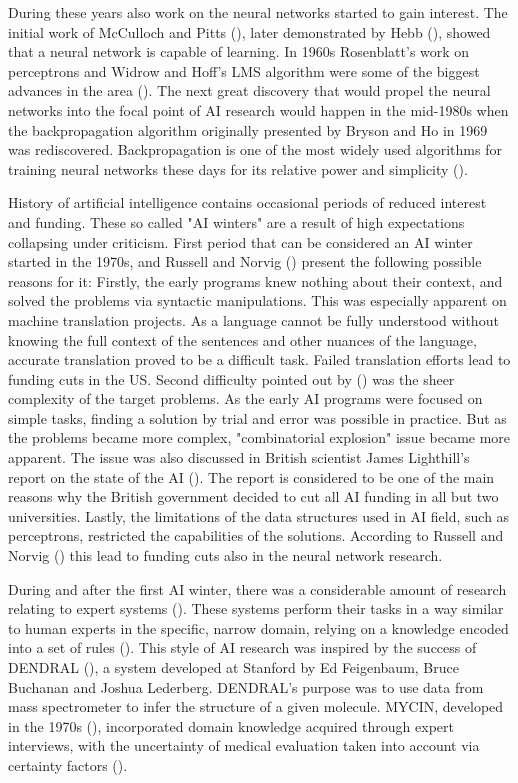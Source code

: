 \documentclass[utf8,english]{gradu3}
\begin{document}
During these years also work on the neural networks started to gain interest. The initial work of McCulloch and Pitts (\cite*{mcculloch1943}), later demonstrated by Hebb (\cite{norvig2002}), showed that a neural network is capable of learning. In 1960s Rosenblatt's work on perceptrons and Widrow and Hoff's LMS algorithm were some of the biggest advances in the area (\cite{widrow1995}). The next great discovery that would propel the neural networks into the focal point of AI research would happen in the mid-1980s when the backpropagation algorithm originally presented by Bryson and Ho in 1969 was rediscovered. Backpropagation is one of the most widely used algorithms for training neural networks these days for its relative power and simplicity (\cite{rumelhart1995}).

History of artificial intelligence contains occasional periods of reduced interest and funding. These so called "AI winters" are a result of high expectations collapsing under criticism. First period that can be considered an AI winter started in the 1970s, and Russell and Norvig (\cite*{norvig2002}) present the following possible reasons for it: Firstly, the early programs knew nothing about their context, and solved the problems via syntactic manipulations. This was especially apparent on machine translation projects. As a language cannot be fully understood without knowing the full context of the sentences and other nuances of the language, accurate translation proved to be a difficult task. Failed translation efforts lead to funding cuts in the US.
Second difficulty pointed out by (\cite{norvig2002}) was the sheer complexity of the target problems. As the early AI programs were focused on simple tasks, finding a solution by trial and error was possible in practice. But as the problems became more complex, "combinatorial explosion" issue became more apparent. The issue was also discussed in British scientist James Lighthill's report on the state of the AI (\cite*{lighthill1973}). The report is considered to be one of the main reasons why the British government decided to cut all AI funding in all but two universities.
Lastly, the limitations of the data structures used in AI field, such as perceptrons, restricted the capabilities of the solutions. According to Russell and Norvig (\cite*{norvig2002}) this lead to funding cuts also in the neural network research.

During and after the first AI winter, there was a considerable amount of research relating to expert systems (\cite{norvig2002}). These systems perform their tasks in a way similar to human experts in the specific, narrow domain, relying on a knowledge encoded into a set of rules (\cite{myers1986}). This style of AI research was inspired by the success of DENDRAL (\cite{buchanan1968}), a system developed at Stanford by Ed Feigenbaum, Bruce Buchanan and Joshua Lederberg. DENDRAL's purpose was to use data from mass spectrometer to infer the structure of a given molecule. MYCIN, developed in the 1970s (\cite{shortliffe1975}), incorporated domain knowledge acquired through expert interviews, with the uncertainty of medical evaluation taken into account via certainty factors (\cite{norvig2002}).
\end{document}

